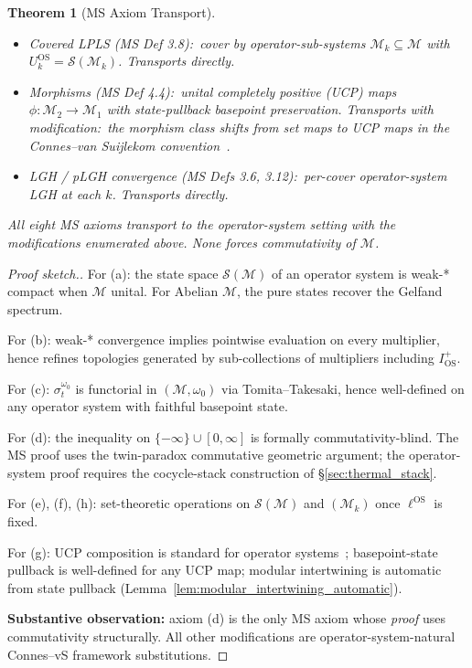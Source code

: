 \documentclass[11pt,a4paper]{article}
\theoremstyle{plain}
\newtheorem{theorem}{Theorem}[section]
\theoremstyle{definition}
\newcommand{\Scal}{\mathcal{S}}
\newcommand{\Mcal}{\mathcal{M}}
\newcommand{\ellOS}{\ell^{\mathrm{OS}}}
\begin{document}
\begin{theorem}[MS Axiom Transport]
\begin{itemize}
Transports directly.
\item[(f)] \emph{Covered LPLS} (MS Def 3.8):\ cover by
operator-sub-systems $\Mcal_{k}\subseteq\Mcal$ with
$U_{k}^{\mathrm{OS}}=\Scal(\Mcal_{k})$. Transports directly.
\item[(g)] \emph{Morphisms} (MS Def 4.4):\ unital completely positive
(UCP) maps $\phi:\Mcal_{2}\to\Mcal_{1}$ with state-pullback basepoint
preservation. Transports with modification:\ the morphism class shifts
from set maps to UCP maps in the Connes--van Suijlekom
convention~\cite{connes_vs2021}.
\item[(h)] \emph{LGH / pLGH convergence} (MS Defs 3.6, 3.12):\
per-cover operator-system LGH at each $k$. Transports directly.
\end{itemize}

All eight MS axioms transport to the operator-system setting with the
modifications enumerated above. None forces commutativity of $\Mcal$.
\end{theorem}

\begin{proof}[Proof sketch.]
For (a): the state space $\Scal(\Mcal)$ of an operator system is
weak-* compact when $\Mcal$ unital. For Abelian $\Mcal$, the pure
states recover the Gelfand spectrum.

For (b): weak-* convergence implies pointwise evaluation on every
multiplier, hence refines topologies generated by sub-collections of
multipliers including $I^{+}_{\mathrm{OS}}$.

For (c): $\sigma_{t}^{\omega_{0}}$ is functorial in
$(\Mcal,\omega_{0})$ via Tomita--Takesaki, hence well-defined on any
operator system with faithful basepoint state.

For (d): the inequality on $\{-\infty\}\cup[0,\infty]$ is
formally commutativity-blind. The MS proof uses the twin-paradox
commutative geometric argument; the operator-system proof requires
the cocycle-stack construction of \S\ref{sec:thermal_stack}.

For (e), (f), (h): set-theoretic operations on $\Scal(\Mcal)$ and
$(\Mcal_{k})$ once $\ellOS$ is fixed.

For (g): UCP composition is standard for operator
systems~\cite{connes_vs2021}; basepoint-state pullback is
well-defined for any UCP map; modular intertwining is automatic from
state pullback (Lemma~\ref{lem:modular_intertwining_automatic}).

\textbf{Substantive observation:} axiom (d) is the only MS axiom whose
\emph{proof} uses commutativity structurally. All other modifications
are operator-system-natural Connes--vS framework substitutions.
\end{proof}
\end{document}
